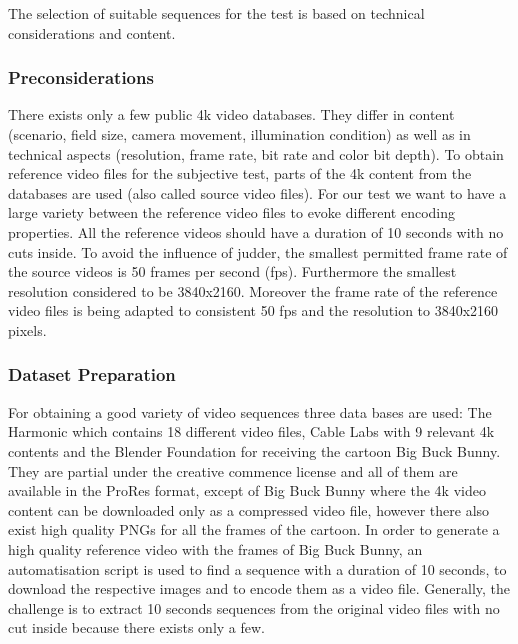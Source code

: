 The selection of suitable sequences for the test is based on technical considerations and content. 
\newline

\subsubsection{Preconsiderations}
There exists only a few public 4k video databases. They differ in content (scenario, field size, camera movement, illumination condition) as well as in technical aspects (resolution, frame rate, bit rate and color bit depth). 
To obtain reference video files for the subjective test, parts of the 4k content from the databases are used (also called source video files).
For our test we want to have a large variety between the reference video files to evoke different encoding properties. 
All the reference videos should have a duration of 10 seconds with no cuts inside.
To avoid the influence of judder, the smallest permitted frame rate of the source videos is 50 frames per second (fps). Furthermore the smallest resolution considered to be 3840x2160. Moreover the frame rate of the reference video files is being adapted to consistent 50 fps and the resolution to 3840x2160 pixels.
\newline

\subsubsection{Dataset Preparation}
For obtaining a good variety of video sequences three data bases are used: The Harmonic \cite{web:harmonic} which contains 18 different video files, Cable Labs \cite{web:cablelabs} with 9 relevant 4k contents and the Blender Foundation \cite{web:bbb} for receiving the cartoon Big Buck Bunny. They  are partial under the creative commence license and all of them are available in the ProRes format, except of Big Buck Bunny where the 4k video content can be downloaded only as a compressed video file, however there also exist high quality PNGs for all the frames of the cartoon. In order to generate a high quality reference video with the frames of Big Buck Bunny, an automatisation script is used to find a sequence with a duration of 10 seconds, to download the respective images and to encode them as a video file.
Generally, the challenge is to extract 10 seconds sequences from the original video files with no cut inside because there exists only a few.

